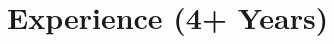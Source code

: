 \documentclass{subfiles}
\begin{document}
\section{Experience (4+ Years)}



% 



% 
\end{document}
